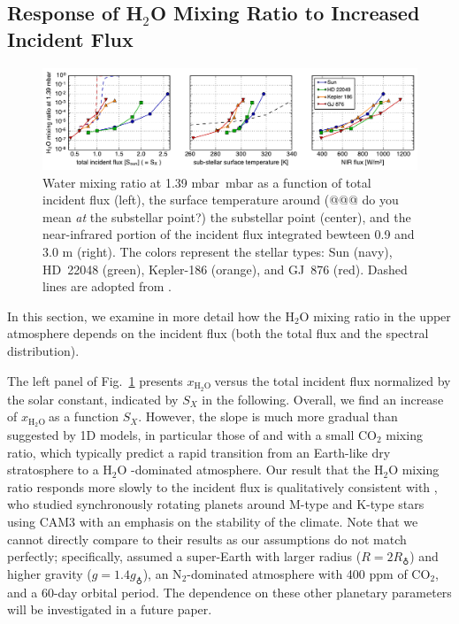 \documentclass[11pt,numberedappendix,twocolappendix,]{emulateapj}
\def\water{H$_2$O }
\def\xwater{\dsa{$x_\text{\water}$}}
\def\preslevel{1.39 mbar\ }
\newcommand{\dsa}[1]{{\color{blue}#1}}
\begin{document}
\subsection{Response of \water Mixing Ratio to Increased Incident Flux}
\label{ss:result_H2Omixingratio}


\begin{figure}[!tb]
    \begin{center}
    \includegraphics[width=\hsize]{fig/xH2O_3panels.pdf}
    \end{center}
\caption{Water mixing ratio at \preslevel mbar as a function of total incident flux (left), the surface temperature around \dsa{(@@@ do you mean \textit{at} the substellar point?)} the \dsa{substellar} point (center), and the near-infrared portion of the incident flux integrated \dsa{bewteen 0.9 and 3.0 \textmu m} (right). The colors represent the stellar types: Sun (navy), HD~22048 (green), Kepler-186 (orange), and GJ~876 (red). Dashed lines are adopted from \citet{Kasting1993}. }                                                                                                             
\label{fig:xH2O_S0X}
\end{figure}

In this section, we examine in more detail how \dsa{the} \water mixing ratio in the upper atmosphere depends on the incident flux (\dsa{both} the total flux \dsa{and} the spectral distribution). 

The left panel of Fig.~\ref{fig:xH2O_S0X} presents \xwater versus the total incident flux normalized by the solar constant, indicated by $S_X$ in the following. 
Overall, we find an increase of \xwater as a function $S_X$. 
However, the slope is much more gradual than suggested by 1D models, in particular those  of \citet{Kasting1993} and \citet{Wordsworth2013} with \dsa{a} small CO$_2$ mixing ratio, which typically predict a rapid transition from an Earth-like dry stratosphere to \dsa{a} \water-dominated atmosphere. 
Our result that \dsa{the} \water mixing ratio responds more slowly to the incident flux is qualitatively consistent with \citet{Yang2013}, who studied synchronously rotating planets around M-type and K-type stars using CAM3 with an emphasis on the stability of the climate. 
Note that we cannot directly compare \dsa{to} their results as \dsa{our} assumptions do not match perfectly; specifically, \cite{Yang2013} assumed a super-Earth with larger radius ($R=2R_\earth$) and higher gravity ($g=1.4g_\earth$), an N$_2$-dominated atmosphere with 400 ppm of CO$_2$, and a 60-day orbital period. 
The dependence on these other planetary parameters will be investigated in \dsa{a future paper}. 
\end{document}
